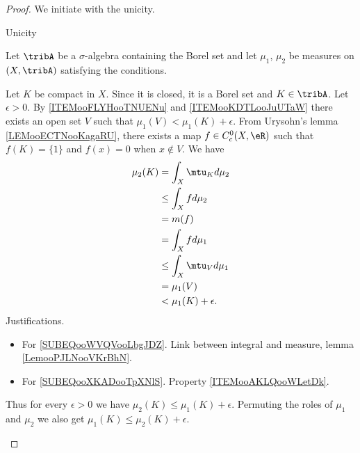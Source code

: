 \begin{proof}
	We initiate with the unicity.
	\begin{center}
		Unicity
	\end{center}
	Let \( \tribA\) be a \( \sigma\)-algebra containing the Borel set and let \( \mu_1\), \( \mu_2\) be measures on \( (X,\tribA)\) satisfying the conditions.
	\begin{subproof}

		Let \( K\) be compact in \( X\). Since it is closed, it is a Borel set and \( K\in \tribA\). Let \( \epsilon>0\). By \ref{ITEMooFLYHooTNUENu} and \ref{ITEMooKDTLooJuUTaW} there exists an open set \( V\) such that \( \mu_1(V)<\mu_1(K)+\epsilon\). From Urysohn's lemma \ref{LEMooECTNooKagaRU}, there exists a map \( f\in C^0_c(X,\eR)\) such that \( f(K)=\{ 1 \}\) and \( f(x)=0\) when \( x\notin V\). We have
		\begin{subequations}
			\begin{align}
				\mu_2(K) & =\int_X\mtu_Kd\mu_2        \label{SUBEQooWVQVooLbgJDZ} \\
				         & \leq \int_Xfd\mu_2                                     \\
				         & =m(f)                  \label{SUBEQooXKADooTpXNlS}     \\
				         & = \int_Xfd\mu_1                                        \\
				         & \leq \int_X\mtu_{V}d\mu_1                              \\
				         & =\mu_1(V)                                              \\
				         & <\mu_1(K)+\epsilon.
			\end{align}
		\end{subequations}
		Justifications.
		\begin{itemize}
			\item For \eqref{SUBEQooWVQVooLbgJDZ}. Link between integral and measure, lemma \ref{LemooPJLNooVKrBhN}.
			\item For \eqref{SUBEQooXKADooTpXNlS}. Property \ref{ITEMooAKLQooWLetDk}.
		\end{itemize}
		Thus for every \( \epsilon>0\) we have \( \mu_2(K)\leq \mu_1(K)+\epsilon\). Permuting the roles of \( \mu_1\) and \( \mu_2\) we also get \( \mu_1(K)\leq \mu_2(K)+\epsilon\).


\end{subproof}
\end{proof}

